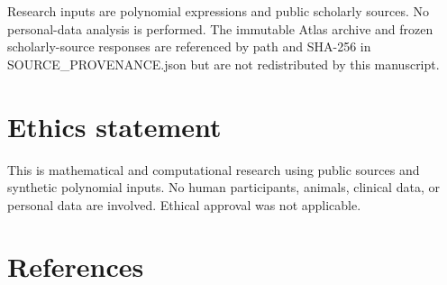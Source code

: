 \documentclass[
  11pt,
  a4paper,
]{amsart}
\begin{document}
Research inputs are polynomial expressions and public scholarly sources.
No personal-data analysis is performed. The immutable Atlas archive and
frozen scholarly-source responses are referenced by path and SHA-256 in
SOURCE\_PROVENANCE.json but are not redistributed by this manuscript.

\section{Ethics statement}

This is mathematical and computational research using public sources and
synthetic polynomial inputs. No human participants, animals, clinical
data, or personal data are involved. Ethical approval was not
applicable.

\section*{References}
\end{document}
